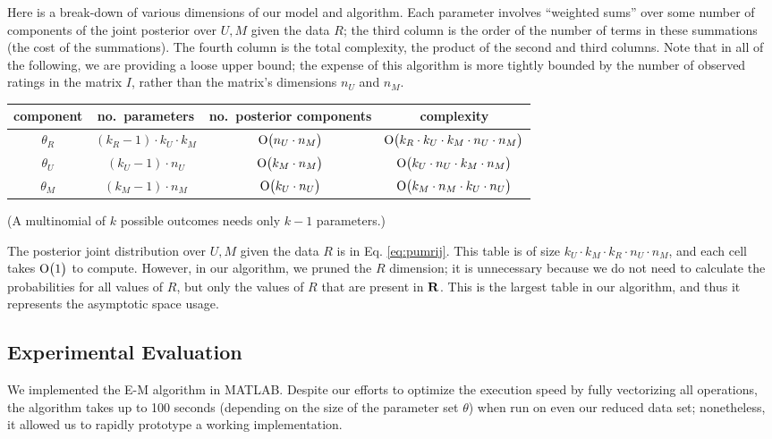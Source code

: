 \documentclass{article}
\begin{document}
Here is a break-down of various dimensions of our model and
algorithm. Each parameter involves ``weighted sums'' over some number
of components of the joint posterior over $U,M$ given the data $R$;
the third column is the order of the number of terms in these
summations (the cost of the summations). The fourth column is the
total complexity, the product of the second and third columns. Note
that in all of the following, we are providing a loose upper bound;
the expense of this algorithm is more tightly bounded by the number of
observed ratings in the matrix $I$, rather than the matrix's
dimensions $n_U$ and $n_M$.
\begin{center}
  \begin{tabular}{c|c|c|c}
    component & no.~parameters &
    no.~posterior components & complexity
    \\ \hline
    $\theta_R$ & $(k_R - 1) \cdot k_U \cdot k_M$ &
    $\operatorname{O}\bigl(n_U \cdot n_M\bigr)$ &
    $\operatorname{O}\bigl(k_R \cdot k_U \cdot k_M \cdot n_U \cdot n_M\bigr)$ \\
    $\theta_U$ & $(k_U - 1) \cdot n_U$ &
    $\operatorname{O}\bigl(k_M \cdot n_M\bigr)$ & $\operatorname{O}\bigl(k_U \cdot n_U \cdot k_M \cdot n_M\bigr)$ \\
    $\theta_M$ & $(k_M - 1) \cdot n_M$ &
    $\operatorname{O}\bigl(k_U \cdot n_U\bigr)$ & $\operatorname{O}\bigl(k_M \cdot n_M \cdot k_U \cdot n_U\bigr)$ \\
  \end{tabular}
\end{center}
(A multinomial of $k$ possible outcomes needs only $k-1$ parameters.)

The posterior joint distribution over $U,M$ given the data $R$ is in
Eq. \ref{eq:pumrij}. This table is of size $k_U \cdot k_M \cdot k_R
\cdot n_U \cdot n_M$, and each cell takes $\operatorname{O}\bigl(1\bigr)$ to
compute. However, in our algorithm, we pruned the $R$ dimension; it is
unnecessary because we do not need to calculate the probabilities for
all values of $R$, but only the values of $R$ that are present in
${\bf R}$. This is the largest table in our algorithm, and thus it
represents the asymptotic space usage.

\subsection{Experimental Evaluation}

We implemented the E-M algorithm in MATLAB. Despite our efforts to
optimize the execution speed by fully vectorizing all operations, the
algorithm takes up to 100 seconds (depending on the size of the
parameter set $\theta$) when run on even our reduced data set;
nonetheless, it allowed us to rapidly prototype a working
implementation.
\end{document}
